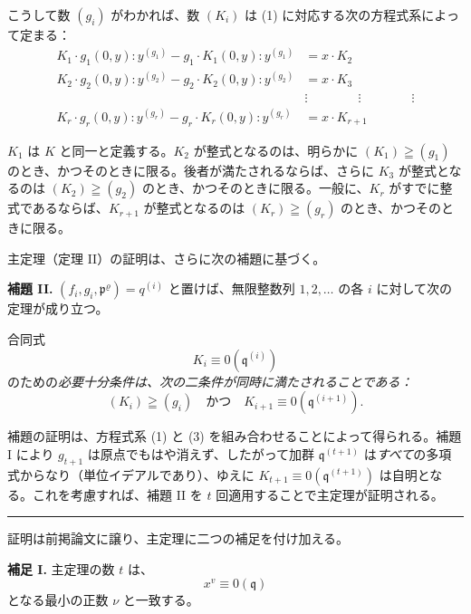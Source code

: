 こうして数 \((g_i)\) がわかれば、数 \((K_i)\) は (1) に対応する次の方程式系によって定まる：
\begin{equation}
\tag{3}
\begin{aligned}
K_1\cdot g_1(0,y):y^{(g_1)} - g_1\cdot K_1(0,y):y^{(g_1)} &= x\cdot K_2\\
K_2\cdot g_2(0,y):y^{(g_2)} - g_2\cdot K_2(0,y):y^{(g_2)} &= x\cdot K_3\\
&\vdots \qquad\qquad\vdots\qquad\qquad\vdots\\
K_r\cdot g_r(0,y):y^{(g_r)} - g_r\cdot K_r(0,y):y^{(g_r)} &= x\cdot K_{r+1}
\end{aligned}
\end{equation}

\(K_1\) は \(K\) と同一と定義する。\(K_2\) が整式となるのは、明らかに \((K_1)\geqq(g_1)\) のとき、かつそのときに限る。後者が満たされるならば、さらに \(K_3\) が整式となるのは \((K_2)\geqq(g_2)\) のとき、かつそのときに限る。一般に、\(K_r\) がすでに整式であるならば、\(K_{r+1}\) が整式となるのは \((K_r)\geqq(g_r)\) のとき、かつそのときに限る。

主定理（定理 II）の証明は、さらに次の補題に基づく。

\textbf{補題 II.} \((f_i,g_i,\mathfrak{p}^\varrho)=q^{(i)}\) と置けば、無限整数列 \(1,2,\ldots\) の各 \(i\) に対して次の定理が成り立つ。

合同式
\[
K_i\equiv0(\mathfrak{q}^{(i)})
\]
のための\emph{必要十分条件は、次の二条件が同時に満たされることである：}
\[
(K_i)\geqq(g_i)\quad \text{かつ}\quad K_{i+1}\equiv0(\mathfrak{q}^{(i+1)}).
\]

補題の証明は、方程式系 (1) と (3) を組み合わせることによって得られる。補題 I により \(g_{t+1}\) は原点でもはや消えず、したがって加群 \(\mathfrak{q}^{(t+1)}\) は\emph{すべて}の多項式からなり（単位イデアルであり）、ゆえに \(K_{t+1}\equiv0(\mathfrak{q}^{(t+1)})\) は自明となる。これを考慮すれば、補題 II を \(t\) 回適用することで主定理が証明される。

\begin{center}
\rule{4cm}{0.4pt}
\end{center}

証明は前掲論文に譲り、主定理に二つの補足を付け加える。

\textbf{補足 I.} 主定理の数 \(t\) は、
\[
x^v\equiv0(\mathfrak{q})
\]
となる最小の正数 \(\nu\) と一致する。

